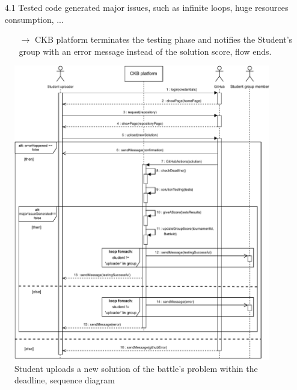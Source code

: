 \documentclass{article}
\begin{document}
{\begin{enumerate}
\begin{xltabular}{\textwidth}
\begin{itemize}
                  \item[4.1] Tested code generated major issues, such as infinite loops,
                        huge resources consumption, ...
                        \begin{itemize}
                            \item[$\rightarrow$] CKB platform terminates the testing phase and
                                  notifies the Student's group with an error message instead of the
                                  solution score, flow ends.
                        \end{itemize}
              \end{itemize}
          \end{xltabular}

          \begin{figure}[H]
              \centering
              \hspace*{-1.6cm}\includegraphics[scale=0.92]{images/SequenceDiagrams/Sequence11.pdf}
              \caption{Student uploads a new solution of the battle's problem within the deadline, sequence diagram}
              \label{fig:CorrectSolutionUploadSeqDiagram}
          \end{figure}


\end{enumerate}}
\end{document}
